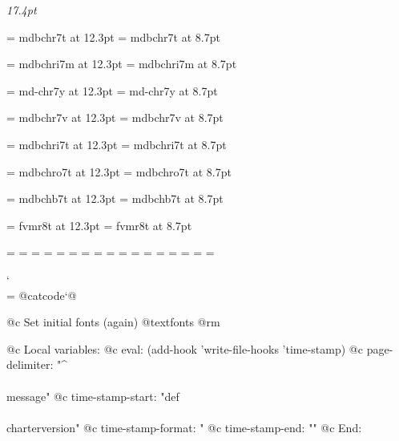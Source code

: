 
\setfont\shortcontrm\rmfontprefix\rmshape{17.4pt}
\setfont\shortcontbf\rmfontprefix\bxshape{17.4pt}
\setfont\shortcontsl\rmfontprefix\slshape{17.4pt}

\setfont\keyrm\rmfontprefix\rmshape{11.6pt}
\setfont\keysy\mtfontprefix\mtsyshape{13.1pt}

\setfont\ordrm\rmfontprefix\rmshape{11pt}
\setfont\fordrm\rmfontprefix\rmshape{9.6pt}

\let\subtitlerm=\textbf
\def\subtitlefont{\subtitlerm \normalbaselineskip = 24pt \normalbaselines}


\font\eightrm=	mdbchr7t at 12.3pt
\font\sixrm=	mdbchr7t at 8.7pt

\font\eighti=	mdbchri7m at 12.3pt
\font\sixi=	mdbchri7m at 8.7pt

\font\eightsy=	md-chr7y at 12.3pt
\font\sixsy=	md-chr7y at 8.7pt

\font\eightex=	mdbchr7v at 12.3pt
\font\sixex=	mdbchr7v at 8.7pt

\font\eightit=	mdbchri7t at 12.3pt
\font\sixit=	mdbchri7t at 8.7pt

\font\eightsl=	mdbchro7t at 12.3pt
\font\sixsl=	mdbchro7t at 8.7pt

\font\eightbf=	mdbchb7t at 12.3pt
\font\sixbf=	mdbchb7t at 8.7pt

\font\eighttt=	fvmr8t at 12.3pt
\font\sixtt=	fvmr8t at 8.7pt

=\eightrm
{}=\sixrm
%
=\eighti
{}=\sixi
%
=\eightsy
{}=\sixsy
%
=\elevenex
{}=\eightex
{}=\sixex
%
\scriptfont\itfam=\eightit
\scriptscriptfont\itfam=\sixit
%
\scriptfont\slfam=\eightsl
\scriptscriptfont\slfam=\sixsl
%
\scriptfont\bffam=\eightbf
\scriptscriptfont\bffam=\sixbf
%
\scriptfont\ttfam=\eighttt
\scriptscriptfont\ttfam=\sixtt


\let\setfont=\setfontorig
\def\setfontorig{\relax}

\catcode`\\=\active
@catcode`@%

@c Set initial fonts (again)
@textfonts
@rm

@c Local variables:
@c eval: (add-hook 'write-file-hooks 'time-stamp)
@c page-delimiter: "^\\\\message"
@c time-stamp-start: "def\\\\charterversion{"
@c time-stamp-format: "%
@c time-stamp-end: "}"
@c End:

